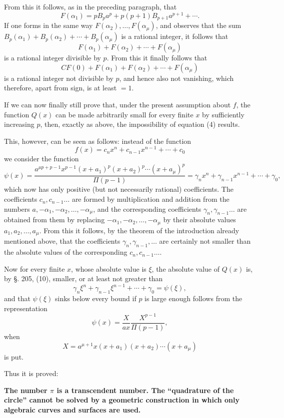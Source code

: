 \documentclass[11pt]{article}
\begin{document}
From this it follows, as in the preceding paragraph, that
\[
F(\alpha_1)=pB_pa^p+p(p+1)B_{p+1}a^{p+1}+\cdots.
\]
If one forms in the same way $F(\alpha_2),\ldots,F(\alpha_\mu)$, and observes that the sum $B_p(\alpha_1)+B_p(\alpha_2)+\cdots+B_p(\alpha_\mu)$ is a rational integer, it follows that
\[
F(\alpha_1)+F(\alpha_2)+\cdots+F(\alpha_\mu)
\]
is a rational integer divisible by $p$. From this it finally follows that
\[
CF(0)+F(\alpha_1)+F(\alpha_2)+\cdots+F(\alpha_\mu)
\]
is a rational integer not divisible by $p$, and hence also not vanishing, which therefore, apart from sign, is at least $=1$.

If we can now finally still prove that, under the present assumption about $f$, the function $Q(x)$ can be made arbitrarily small for every finite $x$ by sufficiently increasing $p$, then, exactly as above, the impossibility of equation (4) results.

This, however, can be seen as follows: instead of the function
\begin{equation}\tag{6}
f(x)=c_nx^n+c_{n-1}x^{n-1}+\cdots+c_0
\end{equation}
we consider the function
\[
\psi(x)=
\frac{a^{\mu p+p-1}x^{p-1}(x+a_1)^p(x+a_2)^p\cdots(x+a_\mu)^p}{\Pi(p-1)}
=\gamma_nx^n+\gamma_{n-1}x^{n-1}+\cdots+\gamma_0,
\]
which now has only positive (but not necessarily rational) coefficients. The coefficients $c_n,c_{n-1}\ldots$ are formed by multiplication and addition from the numbers $a,-\alpha_1,-\alpha_2,\ldots,-\alpha_\mu$, and the corresponding coefficients $\gamma_n,\gamma_{n-1}\ldots$ are obtained from them by replacing $-\alpha_1,-\alpha_2,\ldots,-\alpha_\mu$ by their absolute values $a_1,a_2,\ldots,a_\mu$. From this it follows, by the theorem of the introduction already mentioned above, that the coefficients $\gamma_n,\gamma_{n-1},\ldots$ are certainly not smaller than the absolute values of the corresponding $c_n,c_{n-1}\ldots$.

Now for every finite $x$, whose absolute value is $\xi$, the absolute value of $Q(x)$ is, by §. 205, (10), smaller, or at least not greater than
\[
\gamma_n\xi^n+\gamma_{n-1}\xi^{n-1}+\cdots+\gamma_0=\psi(\xi),
\]
and that $\psi(\xi)$ sinks below every bound if $p$ is large enough follows from the representation
\[
\psi(x)=\frac{X}{ax}\frac{X^{p-1}}{\Pi(p-1)},
\]
when
\[
X=a^{\mu+1}x(x+a_1)(x+a_2)\cdots(x+a_\mu)
\]
is put.

Thus it is proved:

\begin{center}
\textbf{The number $\pi$ is a transcendent number. The ``quadrature of the circle'' cannot be solved by a geometric construction in which only algebraic curves and surfaces are used.}
\end{center}
\end{document}
